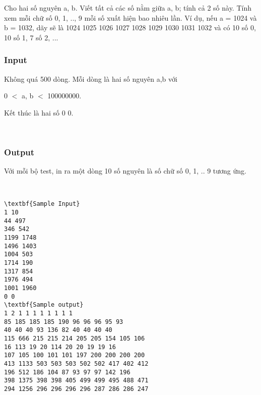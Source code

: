 

Cho hai số nguyên a, b. Viết tất cả các số nằm giữa a, b; tính cả 2 số này. Tính xem mỗi chữ số 0, 1, .., 9 mỗi số xuất hiện bao nhiêu lần. Ví dụ, nếu a = 1024 và b = 1032, dãy sẽ là 1024 1025 1026 1027 1028 1029 1030 1031 1032 và có 10 số 0, 10 số 1, 7 số 2, ...

\subsubsection{Input}

Không quá 500 dòng. Mỗi dòng là hai số nguyên a,b với


0 $<$ a, b $<$ 100000000.


Kết thúc là hai số 0 0.

 

\subsubsection{Output}

Với mỗi bộ test, in ra một dòng 10 số nguyên là số chữ số 0, 1, .. 9 tương ứng. 

 
\begin{verbatim}
\textbf{Sample Input}
1 10 
44 497 
346 542 
1199 1748 
1496 1403 
1004 503 
1714 190 
1317 854 
1976 494 
1001 1960 
0 0
\textbf{Sample output}
1 2 1 1 1 1 1 1 1 1 
85 185 185 185 190 96 96 96 95 93 
40 40 40 93 136 82 40 40 40 40 
115 666 215 215 214 205 205 154 105 106 
16 113 19 20 114 20 20 19 19 16 
107 105 100 101 101 197 200 200 200 200 
413 1133 503 503 503 502 502 417 402 412 
196 512 186 104 87 93 97 97 142 196 
398 1375 398 398 405 499 499 495 488 471 
294 1256 296 296 296 296 287 286 286 247 
\end{verbatim}
